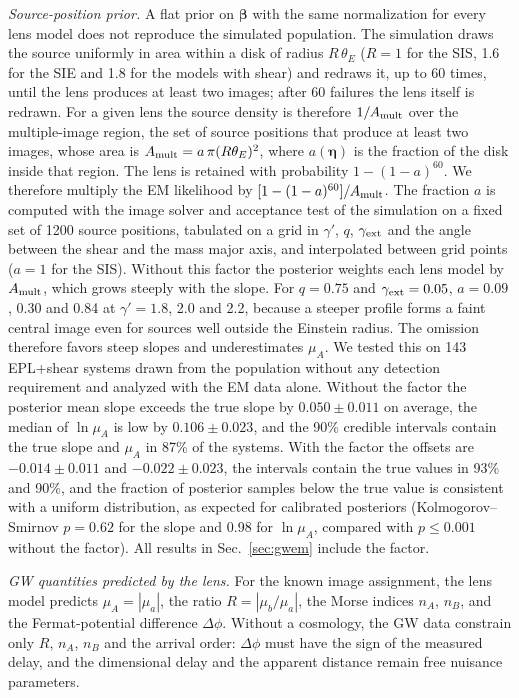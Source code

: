 \emph{Source-position prior.} A flat prior on $\boldsymbol\beta$ with the same normalization for every lens model does not reproduce the simulated population. The simulation draws the source uniformly in area within a disk of radius $R\,\theta_E$ ($R=1$ for the SIS, 1.6 for the SIE and 1.8 for the models with shear) and redraws it, up to 60 times, until the lens produces at least two images; after 60 failures the lens itself is redrawn. For a given lens the source density is therefore $1/A_{\rm mult}$ over the multiple-image region, the set of source positions that produce at least two images, whose area is $A_{\rm mult}=a\,\pi(R\theta_E)^2$, where $a(\boldsymbol\eta)$ is the fraction of the disk inside that region. The lens is retained with probability $1-(1-a)^{60}$. We therefore multiply the EM likelihood by $[1-(1-a)^{60}]/A_{\rm mult}$. The fraction $a$ is computed with the image solver and acceptance test of the simulation on a fixed set of 1200 source positions, tabulated on a grid in $\gamma'$, $q$, $\gamma_{\rm ext}$ and the angle between the shear and the mass major axis, and interpolated between grid points ($a=1$ for the SIS). Without this factor the posterior weights each lens model by $A_{\rm mult}$, which grows steeply with the slope. For $q=0.75$ and $\gamma_{\rm ext}=0.05$, $a=0.09$, 0.30 and 0.84 at $\gamma'=1.8$, 2.0 and 2.2, because a steeper profile forms a faint central image even for sources well outside the Einstein radius. The omission therefore favors steep slopes and underestimates $\mu_A$. We tested this on 143 EPL+shear systems drawn from the population without any detection requirement and analyzed with the EM data alone. Without the factor the posterior mean slope exceeds the true slope by $0.050\pm0.011$ on average, the median of $\ln\mu_A$ is low by $0.106\pm0.023$, and the 90\% credible intervals contain the true slope and $\mu_A$ in 87\% of the systems. With the factor the offsets are $-0.014\pm0.011$ and $-0.022\pm0.023$, the intervals contain the true values in 93\% and 90\%, and the fraction of posterior samples below the true value is consistent with a uniform distribution, as expected for calibrated posteriors (Kolmogorov--Smirnov $p=0.62$ for the slope and 0.98 for $\ln\mu_A$, compared with $p\le0.001$ without the factor). All results in Sec.~\ref{sec:gwem} include the factor.

\emph{GW quantities predicted by the lens.} For the known image assignment, the lens model predicts $\mu_A=|\mu_a|$, the ratio $R=|\mu_b/\mu_a|$, the Morse indices $n_A$, $n_B$, and the Fermat-potential difference $\Delta\phi$. Without a cosmology, the GW data constrain only $R$, $n_A$, $n_B$ and the arrival order: $\Delta\phi$ must have the sign of the measured delay, and the dimensional delay and the apparent distance remain free nuisance parameters.

